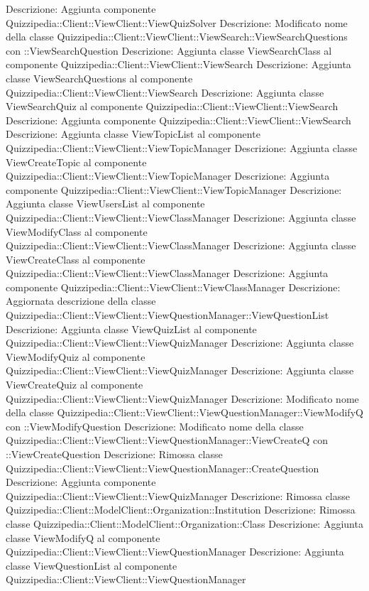 Descrizione: Aggiunta componente Quizzipedia::Client::ViewClient::ViewQuizSolver 
Descrizione: Modificato nome della classe Quizzipedia::Client::ViewClient::ViewSearch::ViewSearchQuestions con ::ViewSearchQuestion 
Descrizione: Aggiunta classe ViewSearchClass al componente Quizzipedia::Client::ViewClient::ViewSearch 
Descrizione: Aggiunta classe ViewSearchQuestions al componente Quizzipedia::Client::ViewClient::ViewSearch 
Descrizione: Aggiunta classe ViewSearchQuiz al componente Quizzipedia::Client::ViewClient::ViewSearch 
Descrizione: Aggiunta componente Quizzipedia::Client::ViewClient::ViewSearch 
Descrizione: Aggiunta classe ViewTopicList al componente Quizzipedia::Client::ViewClient::ViewTopicManager 
Descrizione: Aggiunta classe ViewCreateTopic al componente Quizzipedia::Client::ViewClient::ViewTopicManager 
Descrizione: Aggiunta componente Quizzipedia::Client::ViewClient::ViewTopicManager 
Descrizione: Aggiunta classe ViewUsersList al componente Quizzipedia::Client::ViewClient::ViewClassManager 
Descrizione: Aggiunta classe ViewModifyClass al componente Quizzipedia::Client::ViewClient::ViewClassManager 
Descrizione: Aggiunta classe ViewCreateClass al componente Quizzipedia::Client::ViewClient::ViewClassManager 
Descrizione: Aggiunta componente Quizzipedia::Client::ViewClient::ViewClassManager 
Descrizione: Aggiornata descrizione della classe Quizzipedia::Client::ViewClient::ViewQuestionManager::ViewQuestionList 
Descrizione: Aggiunta classe ViewQuizList al componente Quizzipedia::Client::ViewClient::ViewQuizManager 
Descrizione: Aggiunta classe ViewModifyQuiz al componente Quizzipedia::Client::ViewClient::ViewQuizManager 
Descrizione: Aggiunta classe ViewCreateQuiz al componente Quizzipedia::Client::ViewClient::ViewQuizManager 
Descrizione: Modificato nome della classe Quizzipedia::Client::ViewClient::ViewQuestionManager::ViewModifyQ con ::ViewModifyQuestion 
Descrizione: Modificato nome della classe Quizzipedia::Client::ViewClient::ViewQuestionManager::ViewCreateQ con ::ViewCreateQuestion 
Descrizione: Rimossa classe Quizzipedia::Client::ViewClient::ViewQuestionManager::CreateQuestion 
Descrizione: Aggiunta componente Quizzipedia::Client::ViewClient::ViewQuizManager 
Descrizione: Rimossa classe Quizzipedia::Client::ModelClient::Organization::Institution 
Descrizione: Rimossa classe Quizzipedia::Client::ModelClient::Organization::Class 
Descrizione: Aggiunta classe ViewModifyQ al componente Quizzipedia::Client::ViewClient::ViewQuestionManager 
Descrizione: Aggiunta classe ViewQuestionList al componente Quizzipedia::Client::ViewClient::ViewQuestionManager 
